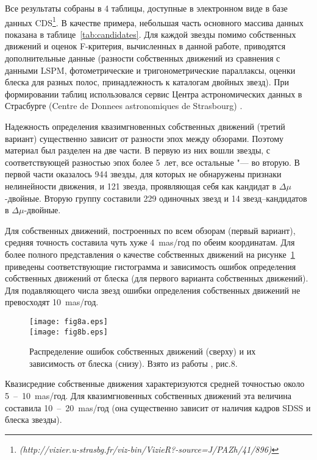 Все результаты собраны в 4 таблицы, доступные в электронном виде в базе данных CDS\footnote{\textit{(http://vizier.u-strasbg.fr/viz-bin/VizieR?-source=J/PAZh/41/896)}}. В качестве примера, небольшая часть основного массива данных показана в таблице~\ref{tab:candidates}. Для каждой звезды помимо собственных движений и оценок F-критерия, вычисленных в данной работе, приводятся дополнительные данные (разности собственных движений из сравнения с данными LSPM, фотометрические и тригонометрические параллаксы, оценки блеска для разных полос, принадлежность к каталогам двойных звезд). При формировании таблиц использовался сервис Центра астрономических данных в Страсбурге (Centre de Donnees astronomiques de Strasbourg) \cite{2000A&AS..143...23O}.

Надежность определения квазимгновенных собственных движений (третий вариант) существенно зависит от разности эпох между обзорами. Поэтому материал был разделен на две части. В первую из них вошли звезды, с соответствующей разностью эпох более 5~лет, все остальные "--- во вторую. В первой части оказалось 944 звезды, для которых не обнаружены признаки нелинейности движения, и 121 звезда, проявляющая себя как кандидат в $\Delta\mu$-двойные. Вторую группу составили 229 одиночных звезд  и 14 звезд--кандидатов в $\Delta\mu$-двойные.

Для собственных движений, построенных по всем обзорам (первый вариант), средняя точность составила чуть хуже 4~mas/год по обеим координатам. Для более полного представления о качестве собственных движений на рисунке~\ref{fig:15emu} приведены соответствующие гистограмма и зависимость ошибок определения собственных движений от блеска (для первого варианта собственных движений). Для подавляющего числа звезд ошибки определения собственных движений не превосходят 10~mas/год.

\begin{figure}[h]
\centering
\texttt{[image: fig8a.eps]}\\
\texttt{[image: fig8b.eps]}
\caption{Распределение ошибок собственных движений (сверху) и их зависимость от блеска (снизу). Взято из работы \cite{2015AstL...41..833K}, рис.8.}
\label{fig:15emu}
\end{figure}

Квазисредние собственные движения характеризуются средней точностью около 5~--~10~mas/год. Для квазимгновенных собственных движений эта величина составила 10~--~20~mas/год (она существенно зависит от наличия кадров SDSS и блеска звезды).

